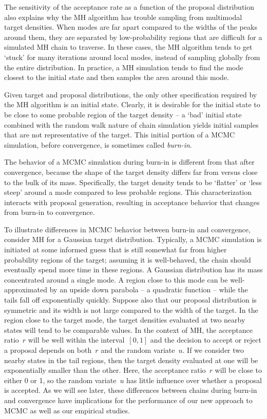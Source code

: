 \documentclass[angelino.tex]{subfiles}
\begin{document}
The sensitivity of the acceptance rate as a function of
the proposal distribution also explains why the MH algorithm
has trouble sampling from multimodal target densities.
When modes are far apart compared to the widths of the peaks around them,
they are separated by low-probability regions that are difficult for a
simulated MH chain to traverse.
In these cases, the MH algorithm tends to get `stuck' for many iterations
around local modes, instead of sampling globally from the entire distribution.
In practice, a MH simulation tends to find the mode closest to the initial state
and then samples the area around this mode.

Given target and proposal distributions, the only other specification required
by the MH algorithm is an initial state.
Clearly, it is desirable for the initial state to be close to some probable
region of the target density -- 
a `bad' initial state combined with the random walk nature of chain simulation
yields initial samples that are not representative of the target.
This initial portion of a MCMC simulation, before convergence,
is sometimes called \emph{burn-in}.

The behavior of a MCMC simulation during burn-in is different from that after
convergence, because the shape of the target density differs
far from versus close to the bulk of its mass.
Specifically, the target density tends to be `flatter' or `less steep'
around a mode compared to less probable regions.
This characterization interacts with proposal generation,
resulting in acceptance behavior that changes from burn-in to convergence.

To illustrate differences in MCMC behavior between burn-in and convergence, 
consider MH for a Gaussian target distribution.
Typically, a MCMC simulation is initiated at some informed guess that is still
somewhat far from higher probability regions of the target; assuming it is
well-behaved, the chain should eventually spend more time in these regions.
A Gaussian distribution has its mass concentrated around a single mode.
A region close to this mode can be well-approximated by an upside down parabola
-- a quadratic function -- while the tails fall off exponentially quickly.
Suppose also that our proposal distribution is symmetric and its width
is not large compared to the width of the target.
In the region close to the target mode, the target densities
evaluated at two nearby states will tend to be comparable values.
In the context of MH, the acceptance ratio~$r$ will be well within the
interval~$[0, 1]$ and the decision to accept or reject a proposal depends on
both~$r$ and the random variate~$u$.
If we consider two nearby states in the tail regions, then the target
density evaluated at one will be exponentially smaller than the other.
Here, the acceptance ratio~$r$ will be close to either 0 or 1, so the
random variate~$u$ has little influence over whether a proposal is accepted.
As we will see later, these differences between chains during burn-in and
convergence have implications for the performance of our new approach to
MCMC as well as our empirical studies.
\end{document}
